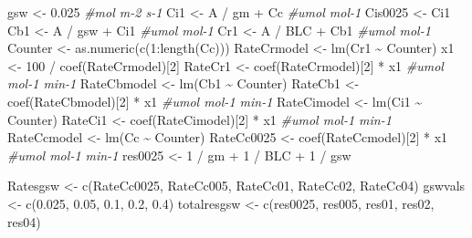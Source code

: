 \documentclass[
]{krantz}
\makeatletter
\newenvironment{Shaded}{\begin{snugshade}}{\end{snugshade}}
\newcommand{\CommentTok}[1]{\textcolor[rgb]{0.56,0.35,0.01}{\textit{#1}}}
\newcommand{\DecValTok}[1]{\textcolor[rgb]{0.00,0.00,0.81}{#1}}
\newcommand{\FloatTok}[1]{\textcolor[rgb]{0.00,0.00,0.81}{#1}}
\newcommand{\FunctionTok}[1]{\textcolor[rgb]{0.00,0.00,0.00}{#1}}
\newcommand{\NormalTok}[1]{#1}
\newcommand{\OtherTok}[1]{\textcolor[rgb]{0.56,0.35,0.01}{#1}}
\newcommand{\SpecialCharTok}[1]{\textcolor[rgb]{0.00,0.00,0.00}{#1}}
\newenvironment{kframe}{%
\medskip{}
\setlength{\fboxsep}{.8em}
 \def\at@end@of@kframe{}%
 \ifinner\ifhmode%
  \def\at@end@of@kframe{\end{minipage}}%
  \begin{minipage}{\columnwidth}%
 \fi\fi%
 \def\FrameCommand##1{\hskip\@totalleftmargin \hskip-\fboxsep
 \colorbox{shadecolor}{##1}\hskip-\fboxsep
     \hskip-\linewidth \hskip-\@totalleftmargin \hskip\columnwidth}%
 \MakeFramed {\advance\hsize-\width
   \@totalleftmargin\z@ \linewidth\hsize
   \@setminipage}}%
 {\par\unskip\endMakeFramed%
 \at@end@of@kframe}
\renewenvironment{Shaded}{\begin{kframe}}{\end{kframe}}
\makeatother
\begin{document}
\begin{Shaded}
\begin{Highlighting}[]
\NormalTok{gsw }\OtherTok{\textless{}{-}} \FloatTok{0.025} \CommentTok{\#mol m{-}2 s{-}1}
\NormalTok{Ci1 }\OtherTok{\textless{}{-}}\NormalTok{ A }\SpecialCharTok{/}\NormalTok{ gm }\SpecialCharTok{+}\NormalTok{ Cc }\CommentTok{\#umol mol{-}1}
\NormalTok{Cis0025 }\OtherTok{\textless{}{-}}\NormalTok{ Ci1}
\NormalTok{Cb1 }\OtherTok{\textless{}{-}}\NormalTok{ A }\SpecialCharTok{/}\NormalTok{ gsw }\SpecialCharTok{+}\NormalTok{ Ci1 }\CommentTok{\#umol mol{-}1}
\NormalTok{Cr1 }\OtherTok{\textless{}{-}}\NormalTok{ A }\SpecialCharTok{/}\NormalTok{ BLC }\SpecialCharTok{+}\NormalTok{ Cb1 }\CommentTok{\#umol mol{-}1}
\NormalTok{Counter }\OtherTok{\textless{}{-}} \FunctionTok{as.numeric}\NormalTok{(}\FunctionTok{c}\NormalTok{(}\DecValTok{1}\SpecialCharTok{:}\FunctionTok{length}\NormalTok{(Cc)))}
\NormalTok{RateCrmodel }\OtherTok{\textless{}{-}} \FunctionTok{lm}\NormalTok{(Cr1 }\SpecialCharTok{\textasciitilde{}}\NormalTok{ Counter)}
\NormalTok{x1 }\OtherTok{\textless{}{-}} \DecValTok{100} \SpecialCharTok{/} \FunctionTok{coef}\NormalTok{(RateCrmodel)[}\DecValTok{2}\NormalTok{]}
\NormalTok{RateCr1 }\OtherTok{\textless{}{-}} \FunctionTok{coef}\NormalTok{(RateCrmodel)[}\DecValTok{2}\NormalTok{] }\SpecialCharTok{*}\NormalTok{ x1 }\CommentTok{\#umol mol{-}1 min{-}1}
\NormalTok{RateCbmodel }\OtherTok{\textless{}{-}} \FunctionTok{lm}\NormalTok{(Cb1 }\SpecialCharTok{\textasciitilde{}}\NormalTok{ Counter)}
\NormalTok{RateCb1 }\OtherTok{\textless{}{-}} \FunctionTok{coef}\NormalTok{(RateCbmodel)[}\DecValTok{2}\NormalTok{] }\SpecialCharTok{*}\NormalTok{ x1 }\CommentTok{\#umol mol{-}1 min{-}1}
\NormalTok{RateCimodel }\OtherTok{\textless{}{-}} \FunctionTok{lm}\NormalTok{(Ci1 }\SpecialCharTok{\textasciitilde{}}\NormalTok{ Counter)}
\NormalTok{RateCi1 }\OtherTok{\textless{}{-}} \FunctionTok{coef}\NormalTok{(RateCimodel)[}\DecValTok{2}\NormalTok{] }\SpecialCharTok{*}\NormalTok{ x1 }\CommentTok{\#umol mol{-}1 min{-}1}
\NormalTok{RateCcmodel }\OtherTok{\textless{}{-}} \FunctionTok{lm}\NormalTok{(Cc }\SpecialCharTok{\textasciitilde{}}\NormalTok{ Counter)}
\NormalTok{RateCc0025 }\OtherTok{\textless{}{-}} \FunctionTok{coef}\NormalTok{(RateCcmodel)[}\DecValTok{2}\NormalTok{] }\SpecialCharTok{*}\NormalTok{ x1 }\CommentTok{\#umol mol{-}1 min{-}1}
\NormalTok{res0025 }\OtherTok{\textless{}{-}} \DecValTok{1} \SpecialCharTok{/}\NormalTok{ gm }\SpecialCharTok{+} \DecValTok{1} \SpecialCharTok{/}\NormalTok{ BLC }\SpecialCharTok{+} \DecValTok{1} \SpecialCharTok{/}\NormalTok{ gsw}

\NormalTok{Ratesgsw }\OtherTok{\textless{}{-}} \FunctionTok{c}\NormalTok{(RateCc0025, RateCc005, RateCc01, RateCc02, RateCc04)}
\NormalTok{gswvals }\OtherTok{\textless{}{-}} \FunctionTok{c}\NormalTok{(}\FloatTok{0.025}\NormalTok{, }\FloatTok{0.05}\NormalTok{, }\FloatTok{0.1}\NormalTok{, }\FloatTok{0.2}\NormalTok{, }\FloatTok{0.4}\NormalTok{)}
\NormalTok{totalresgsw }\OtherTok{\textless{}{-}} \FunctionTok{c}\NormalTok{(res0025, res005, res01, res02, res04)}


\end{Highlighting}
\end{Shaded}
\end{document}
